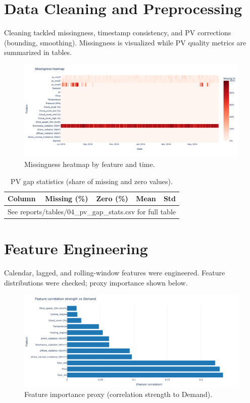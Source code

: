\documentclass[12pt,a4paper]{article}
\begin{document}
\section{Data Cleaning and Preprocessing}
Cleaning tackled missingness, timestamp consistency, and PV corrections (bounding, smoothing). Missingness is visualized while PV quality metrics are summarized in tables.

\begin{figure}[H]
  \centering
  \includegraphics[width=\linewidth]{04_missingness_heatmap.png}
  \caption{Missingness heatmap by feature and time.}
  \label{fig:missingness}
\end{figure}

\begin{table}[H]
  \centering
  \caption{PV gap statistics (share of missing and zero values).}
  \label{tab:pv_gap}
  \begin{tabular}{lrrrr}
  \toprule
  Column & Missing (\%) & Zero (\%) & Mean & Std \\
  \midrule
  \multicolumn{5}{c}{See reports/tables/04\_pv\_gap\_stats.csv for full table} \\
  \bottomrule
  \end{tabular}
\end{table}

\section{Feature Engineering}
Calendar, lagged, and rolling-window features were engineered. Feature distributions were checked; proxy importance shown below.

\begin{figure}[H]
  \centering
  \includegraphics[width=\linewidth]{05_feature_importance.png}
  \caption{Feature importance proxy (correlation strength to Demand).}
  \label{fig:feat_importance}
\end{figure}
\end{document}
